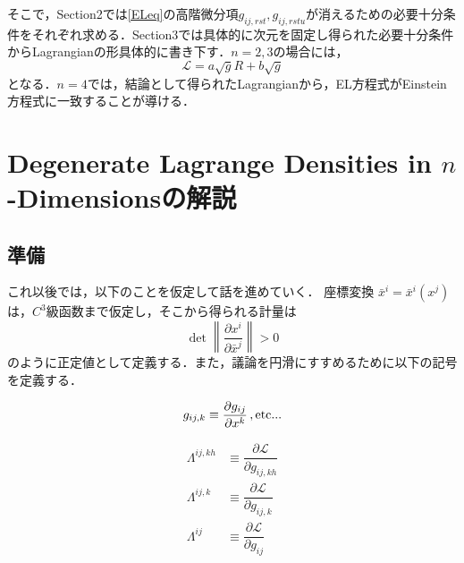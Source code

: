 \documentclass[12pt, a4paper]{jsarticle}
\newcommand{\norm}[1]{\left\lVert#1\right\rVert}
\begin{document}
そこで，Section2では\eqref{ELeq}の高階微分項\(g_{ij,rst}, g_{ij,rstu} \)が消えるための必要十分条件をそれぞれ求める．Section3では具体的に次元を固定し得られた必要十分条件からLagrangianの形具体的に書き下す．\(n=2,3\)の場合には，
\begin{equation*}
  \mathscr{L} = a\sqrt{g}R + b \sqrt{g}
  \tag{3.1} \label{n=2,3}
\end{equation*}
となる．\(n=4\)では，結論として得られたLagrangianから，EL方程式がEinstein方程式に一致することが導ける．
\section{Degenerate Lagrange Densities in \(n\)-Dimensionsの解説}
\subsection{準備}
これ以後では，以下のことを仮定して話を進めていく．
座標変換 \(\bar{x}^i=\bar{x}^i(x^j)\)は，\(C^3\)級函数まで仮定し，そこから得られる計量は
\begin{equation*}
  \det\norm{\dfrac{\partial x^i}{\partial \bar{x}^j}}>0
\end{equation*}
のように正定値として定義する．また，議論を円滑にすすめるために以下の記号を定義する．

\begin{equation*}
  g_{ij,k} \equiv \dfrac{\partial g_{ij} }{\partial x^k } \, , \rm{etc} ...
\end{equation*}

\begin{equation*}
  \begin{split}
    \varLambda^{ij,kh} &\equiv \dfrac{\partial \mathscr{L}  }{\partial g_{ij,kh} } \\
    \varLambda^{ij,k} &\equiv \dfrac{\partial \mathscr{L}  }{\partial g_{ij,k} } \\
    \varLambda^{ij} &\equiv \dfrac{\partial \mathscr{L}  }{\partial g_{ij} }
  \end{split}
  \tag{2.2} \label{lam1}
\end{equation*}
\end{document}
